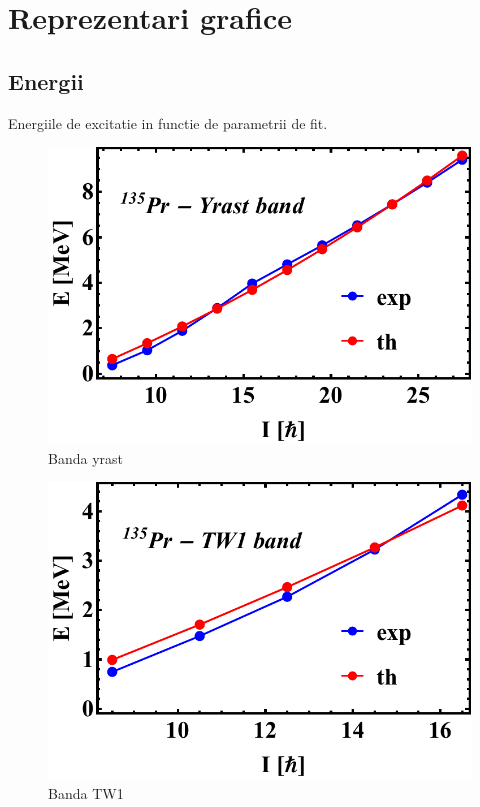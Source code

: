 \documentclass[12pt]{article}
\begin{document}
    \section{Reprezentari grafice}
    \subsection{Energii}
    Energiile de excitatie in functie de parametrii de fit.
    \begin{figure}[h]
        \centering
        \includegraphics[scale=0.8]{images/tsd1.pdf}
        \caption{Banda yrast}
    \end{figure}
    \begin{figure}[h]
        \centering
        \includegraphics[scale=0.8]{images/tsd2.pdf}
        \caption{Banda TW1}
    \end{figure}
\end{document}
